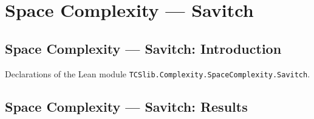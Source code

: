\section{Space Complexity --- Savitch}
\subsection*{Space Complexity --- Savitch: Introduction}

Declarations of the Lean module \texttt{TCSlib.Complexity.SpaceComplexity.Savitch}.

\subsection*{Space Complexity --- Savitch: Results}


